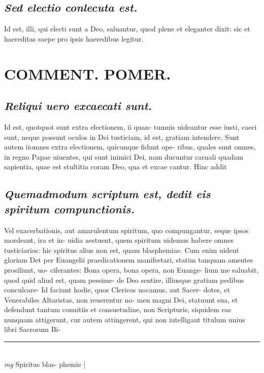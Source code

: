 \documentclass{article}
\begin{document}
\begin{pages}
\subsection*{\textit{Sed electio conlecuta est. }}\pstart Id est, illi, qui electi sunt a Deo, saluantur, quod plene et eleganter dixit: sic et haereditas saepe pro ipsis haeredibus legitur.   \pend
\section*{COMMENT. POMER.  }
{}
\subsection*{\textit{Reliqui uero excaecati sunt. }}\pstart Id est, quotquot sunt extra electionem, ii quan- tumuis uideantur esse iusti, caeci sunt, neque possunt oculos in Dei tusticiam, id est, gratiam intendere. Sunt autem iiomnes extra electionem, quicunque fidunt ope- ribus, quales sunt omnes, in regno Papae uiuentes, qui sunt inimici Dei, nam ducuntur carnali quadam sapientia, quae est stultitia coram Deo, qua et excae cantur. Hinc addit  \pend
{}
{}
\subsection*{\textit{Quemadmodum scriptum est, dedit eis spiritum compunctionis. }}\pstart Vel exacerbationis, aut amarulentum spiritum, quo compungantur, seque ipsos mordeant, ira et in- uidia aestuent, quem spiritum uidemus habere omnes tusticiarios: hic spiritus alius non est, quam blasphemiae. Cum enim uident gloriam Det per Euangelii praedicationem manifestari, statim tanquam amentes prosiliunt, uo- ciferantes: Bona opera, bona opera, non Euange- lium me saluabit, quod quid aliud est, quam pessime- de Deo sentire, illiusque gratiam pedibus conculcare- Id faciunt hodie, quos Clericos uocamus, aut Sacer- dotes, et Venerabiles Altaristas, non reuerentur no- men magni Dei, statuunt sua, et defendunt tantum conuitiis et consuetudine, non Scripturis, siquidem eas nunquam attigerunt, cur autem attingerent, qui non iutelligant titulum unius libri Sacrorum Bi-  \pend
\vspace{0.5cm}\noindent
\vspace{0.2cm}\rule{1cm}{0.2pt}\\ 
\hspace{0.2cm}\textit{mg}
\footnotesize Spiritus blas- phemie 
\normalsize| 

\end{pages}
\end{document}
